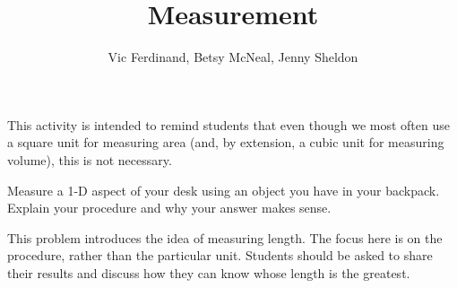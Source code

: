 \documentclass[handout]{ximera}
\title{Measurement}
\author{Vic Ferdinand, Betsy McNeal, Jenny Sheldon}
\begin{document}
\begin{abstract}
\end{abstract}
\maketitle

\begin{instructorIntro}
This activity is intended to remind students that even though we most often use a square unit for measuring area (and, by extension, a cubic unit for measuring volume), this is not necessary.


\end{instructorIntro}

\begin{problem}
Measure a 1-D aspect of your desk using an object you have in your backpack.  Explain your procedure and why your answer makes sense.  

\begin{instructorIntro}
This problem introduces the idea of measuring length.  The focus here is on the procedure, rather than the particular unit.  Students should be asked to share their results and discuss how they can know whose length is the greatest.
\end{instructorIntro}
\end{problem}



\end{document}
